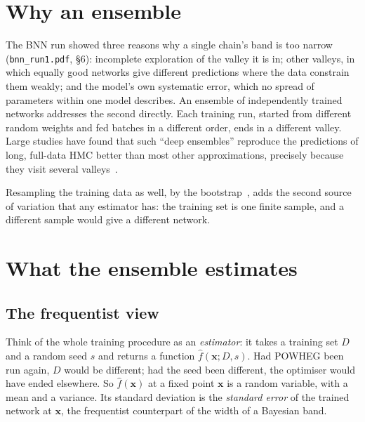 \documentclass[11pt]{article}
\newcommand{\file}[1]{\nolinkurl{#1}}
\newcommand{\bx}{\boldsymbol{x}}
\begin{document}
\tableofcontents

\section{Why an ensemble}
\label{sec:why}

The BNN run showed three reasons why a single chain's band is too narrow
(\file{bnn_run1.pdf}, \S6): incomplete exploration of the valley it is in; other valleys,
in which equally good networks give different predictions where the data constrain them
weakly; and the model's own systematic error, which no spread of parameters within one
model describes. An ensemble of independently trained networks addresses the second
directly. Each training run, started from different random weights and fed batches in a
different order, ends in a different valley. Large studies have found that such
``deep ensembles'' reproduce the predictions of long, full-data HMC better than most
other approximations, precisely because they visit several valleys~\cite{izmailov2021,
wilson2020, lakshminarayanan2017}.

Resampling the training data as well, by the bootstrap~\cite{efron1993}, adds the second
source of variation that any estimator has: the training set is one finite sample, and a
different sample would give a different network.

\section{What the ensemble estimates}
\label{sec:what}

\subsection{The frequentist view}

Think of the whole training procedure as an \emph{estimator}: it takes a training set
$D$ and a random seed $s$ and returns a function $\hat f(\bx; D, s)$. Had POWHEG been run
again, $D$ would be different; had the seed been different, the optimiser would have
ended elsewhere. So $\hat f(\bx)$ at a fixed point $\bx$ is a random variable, with a
mean and a variance. Its standard deviation is the \emph{standard error} of the trained
network at $\bx$, the frequentist counterpart of the width of a Bayesian band.
\end{document}
